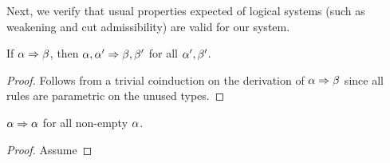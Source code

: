 Next, we verify that usual properties expected of logical systems (such as weakening and cut admissibility) are valid for our system.

\begin{lemma}[Weakening]
  \label{refinements:subtyping-weakening}
  If $\alpha \mathrel\Rightarrow \beta$, then  $\alpha, \alpha' \mathrel\Rightarrow \beta, \beta'$ for all $\alpha', \beta'$.
\end{lemma}
\begin{proof}
  Follows from a trivial coinduction on the derivation of $\alpha \mathrel\Rightarrow \beta$ since all rules are parametric on the unused types.
\end{proof}

\begin{theorem}
  \label{refinements:subtyping-identity}
  $\alpha \mathrel\Rightarrow \alpha$ for all non-empty $\alpha$.
\end{theorem}
\begin{proof}
  Assume 
\end{proof}

